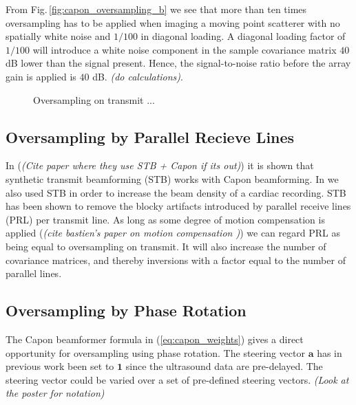 \documentclass[journal]{IEEEtran}
\renewcommand{\vec}[1]{\mathbf{#1}}
\newcommand{\img}{img/}
\newcommand\comment[1]{\textit{{\color{red}(#1)}}}
\begin{document}
From Fig.\,\ref{fig:capon_oversampling_b} we see that more than ten times oversampling has to be applied when imaging a moving point scatterer with no spatially white noise and $1/100$ in diagonal loading. A diagonal loading factor of $1/100$ will introduce a white noise component in the sample covariance matrix $40$ dB lower than the signal present. Hence, the signal-to-noise ratio before the array gain is applied is $40$ dB. \comment{do calculations}.

\begin{figure*}[!t]
\centerline{
\subfloat[]{
\texttt{[image: \\img capon\_L=32\_K=1\_d=001\_2x\_oversampling\_2.eps]}\label{fig:capon_oversampling_a}
}
\subfloat[]{
\texttt{[image: \\img capon\_L=32\_K=1\_d=001\_10x\_oversampling\_2\_zoomed.eps]}\label{fig:capon_oversampling_b}
}
}
\caption{Oversampling on transmit ...}
\label{fig:capon_oversampling}
\end{figure*}

\subsection{Oversampling by Parallel Recieve Lines}
In (\comment{Cite paper where they use STB + Capon if its out}) it is shown that  synthetic transmit beamforming (STB) \cite{Hergum2007} works with Capon beamforming. In  \cite{Asen} we also used STB in order to increase the beam density of a cardiac recording. STB has been shown to remove the blocky artifacts introduced by parallel receive lines (PRL) per transmit line. As long as some degree of motion compensation is applied (\comment{cite bastien's paper on motion compensation }) we can regard PRL as being equal to oversampling on transmit. It will also increase the number of covariance matrices, and thereby inversions with a factor equal to the number of parallel lines.

\subsection{Oversampling by Phase Rotation}
The Capon beamformer formula in (\ref{eq:capon_weights}) gives a direct opportunity for oversampling using phase rotation. The steering vector $\vec{a}$ has in previous work been set to $\vec{1}$ since the ultrasound data are pre-delayed. The steering vector could be varied over a set of pre-defined steering vectors. \comment{Look at the poster for notation}
\end{document}
